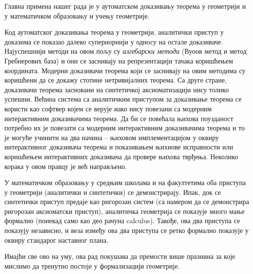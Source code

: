 Главна примена нашег рада је у аутоматском доказивању теорема у
геометрији и у математичком образовању и учењу геометрије.

Код аутоматског доказивања теорема у геометрији, аналитички приступ у
доказима се показао далеко супериорнији у односу на остале
доказиваче. Најуспешнији методи на овом пољу су \emph{алгебарски
  методи} (Вуоов метод\cite{wu} и метод Гребнерових
база\cite{buchberger,kapur}) и они се заснивају на репрезентацији
тачака коришћењем координата. Модерни доказивачи теорема који се
заснивају на овим методима су коришћени да се докажу стотине
нетривијалних теорема. Са друге стране, доказивачи теорема засновани
на синтетичкој аксиоматизацији нису толико успешни. Већина система са
аналитичким приступом за доказивање теорема се користи као софтвер
којем се верује иако нису повезани са модерним интерактивним
доказивачима теорема. Да би се повећала њихова поузданост потребно их
је повезати са модерним интерактивним доказивачима теорема и то је
могуће учинити на два начина -- њиховом имплементацијом у оквиру
интерактивног доказивача теорема и показивањем њихиове исправности или
коришћењем интерактивних доказивача да провере њихова
тврђења. Неколико корака у овом правцу је већ
направљено\cite{wucoq,thedu}.

У математичком образовању у средњим школама и на факултетима оба
приступа у геометрији (аналитички и синтетички) се
демонстрирају. Ипак, док се синтетички приступ предаје као ригорозан
систем (са намером да се демонстрира ригорозан аксиоматски приступ),
аналитичка геометрија се показује много мање формално (понекад само
као део рачуна calculus).  Такође, ова два приступа се показују
независно, и веза између ова два приступа се ретко формално показује у
оквиру стандарог наставног плана.

Имајћи све ово на уму, ова рад покушава да премости више празнина за
које мислимо да тренутно постоје у формализацији геометрије.


